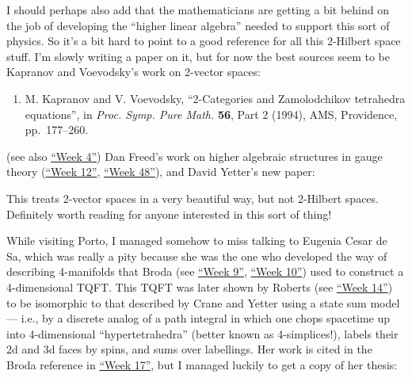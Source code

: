 \documentclass{article}
\def\tightlist{}
\renewcommand{\texttt}[1]{%
  \begingroup
  \ttfamily
  \begingroup\lccode`~=`/\lowercase{\endgroup\def~}{/\discretionary{}{}{}}%
  \begingroup\lccode`~=`[\lowercase{\endgroup\def~}{[\discretionary{}{}{}}%
  \begingroup\lccode`~=`.\lowercase{\endgroup\def~}{.\discretionary{}{}{}}%
  \catcode`/=\active\catcode`[=\active\catcode`.=\active
  \scantokens{#1\noexpand}%
  \endgroup
}
\begin{document}
I should perhaps also add that the mathematicians are getting a bit
behind on the job of developing the ``higher linear algebra'' needed to
support this sort of physics. So it's a bit hard to point to a good
reference for all this 2-Hilbert space stuff. I'm slowly writing a paper
on it, but for now the best sources seem to be Kapranov and Voevodsky's
work on 2-vector spaces:

\begin{enumerate}
\def\labelenumi{\arabic{enumi})}
\setcounter{enumi}{1}
\tightlist
\item
  M. Kapranov and V. Voevodsky, ``2-Categories and Zamolodchikov
  tetrahedra equations'', in \emph{Proc. Symp. Pure Math.} \textbf{56},
  Part 2 (1994), AMS, Providence, pp.~177--260.
\end{enumerate}

(see also \protect\hyperlink{week4}{``Week 4''}) Dan Freed's work on
higher algebraic structures in gauge theory
(\protect\hyperlink{week12}{``Week 12''},
\protect\hyperlink{week48}{``Week 48''}), and David Yetter's new paper:


This treats 2-vector spaces in a very beautiful way, but not 2-Hilbert
spaces. Definitely worth reading for anyone interested in this sort of
thing!

While visiting Porto, I managed somehow to miss talking to Eugenia Cesar
de Sa, which was really a pity because she was the one who developed the
way of describing 4-manifolds that Broda (see
\protect\hyperlink{week9}{``Week 9''}, \protect\hyperlink{week10}{``Week
10''}) used to construct a 4-dimensional TQFT. This TQFT was later shown
by Roberts (see \protect\hyperlink{week14}{``Week 14''}) to be
isomorphic to that described by Crane and Yetter using a state sum model
--- i.e., by a discrete analog of a path integral in which one chops
spacetime up into 4-dimensional ``hypertetrahedra'' (better known as
4-simplices!), labels their 2d and 3d faces by spins, and sums over
labellings. Her work is cited in the Broda reference in
\protect\hyperlink{week17}{``Week 17''}, but I managed luckily to get a
copy of her thesis:
\end{document}
